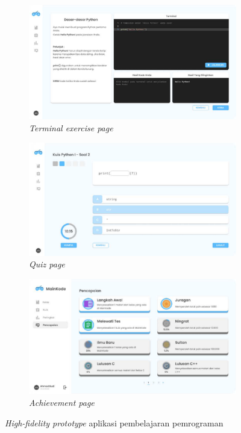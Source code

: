 \begin{figure}[htbp]
\begin{subfigure}[b]{0.35\textwidth}
	  \label{fig:sub2-a2}
	\end{subfigure}
	\hfill
	\begin{subfigure}[b]{0.35\textwidth}
		\centering
		\includegraphics[width=\linewidth]{contents/chapter-2/images/Evan-a3.png}
		\caption{\textit{Terminal exercise page}}
		\label{fig:sub3-a3}
	\end{subfigure}  
	\begin{subfigure}[b]{0.35\textwidth}
		\centering
		\includegraphics[width=\linewidth]{contents/chapter-2/images/Evan-a4.png}
		\caption{\textit{Quiz page}}
		\label{fig:sub4-a4}
	\end{subfigure} 
	\begin{subfigure}[b]{0.35\textwidth}
		\centering
		\includegraphics[width=\linewidth]{contents/chapter-2/images/Evan-a5.png}
		\caption{\textit{Achievement page}}
		\label{fig:sub5-a5}
	\end{subfigure} 
	\caption{\textit{High-fidelity prototype} aplikasi pembelajaran pemrograman}
	\label{fig:High-fidelity prototype Evan}
  \end{figure}
